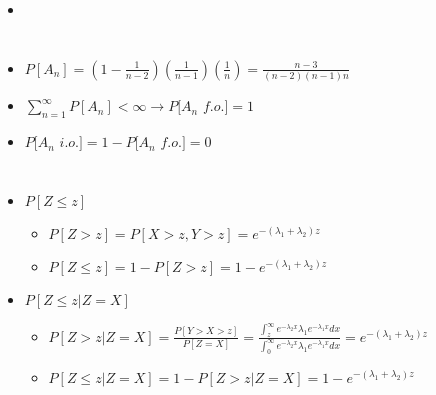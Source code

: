 \documentclass[a4paper]{article}
\begin{document}
\section{}
\begin{itemize}
\begin{figure} [H]
    \texttt{[image: question/3.png]}
\end{figure}
    \item 
\end{itemize}

\section{}
\begin{itemize}
\begin{figure} [H]
    \texttt{[image: question/4.png]}
\end{figure}
    \item $P[A_n] = (1-\frac{1}{n-2})(\frac{1}{n-1})(\frac{1}{n}) = \frac{n-3}{(n-2)(n-1)n}$
    \item $\sum_{n = 1}^\infty P[A_n] < \infty \rightarrow P[A_n$ $f.o.] = 1$
    \item $P[A_n$ $i.o.] = 1 - P[A_n$ $f.o.] = 0$
\end{itemize}

\section{}
\begin{itemize}
\begin{figure} [H]
    \texttt{[image: question/5.png]}
\end{figure}
    \item $P[Z \leq z]$
        \begin{itemize}
            \item $P[Z > z] = P[X > z, Y>z] = e^{-(\lambda_1 + \lambda_2)z}$
            \item $P[Z \leq z] = 1 - P[Z>z] = 1 - e^{-(\lambda_1 + \lambda_2)z}$
        \end{itemize}
    \item $P[Z \leq z | Z=X]$
        \begin{itemize}
            \item $P[Z > z | Z=X] = \frac{P[Y>X>z]}{P[Z=X]} = \frac{\int_z^\infty e^{-\lambda_2x} \lambda_1 e^{-\lambda_1x}dx}{\int_0^\infty e^{-\lambda_2x} \lambda_1 e^{-\lambda_1x}dx} = e^{-(\lambda_1 + \lambda_2)z}$
            \item $P[Z \leq z | Z=X] = 1 - P[Z>z | Z=X] = 1 - e^{-(\lambda_1 + \lambda_2)z}$
        \end{itemize}
\end{itemize}
\end{document}
